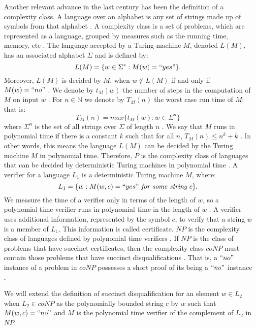 \documentclass[a4paper,UKenglish,cleveref, autoref]{lipics-v2019}
\begin{document}
Another relevant advance in the last century has been the definition of a complexity class. A language over an alphabet is any set of strings made up of symbols from that alphabet \cite{CLRS01}. A complexity class is a set of problems, which are represented as a language, grouped by measures such as the running time, memory, etc \cite{CLRS01}. The language accepted by a Turing machine $M$, denoted $L(M)$, has an associated alphabet $\Sigma$ and is defined by:
\[L(M) = \{w \in \Sigma^{*}: M(w)=``yes" \}.\]
Moreover, $L(M)$ is decided by $M$, when $w \notin L(M)$ if and only if $M(w)=``no"$ \cite{CLRS01}. We denote by $t_{M}(w)$ the number of steps in the computation of $M$ on input $w$ \cite{AB09}. For $n \in \mathbb{N}$ we denote by $T_{M}(n)$ the worst case run time of $M$; that is:
\[T_{M}(n) = max\{t_{M}(w): w \in \Sigma^{n} \}\]
where $\Sigma^{n}$ is the set of all strings over $\Sigma$ of length $n$ \cite{AB09}. We say that $M$ runs in polynomial time if there is a constant $k$ such that for all $n$, $T_{M}(n) \leq n^{k} + k$ \cite{AB09}. In other words, this means the language $L(M)$ can be decided by the Turing machine $M$ in polynomial time. Therefore, $P$ is the complexity class of languages that can be decided by deterministic Turing machines in polynomial time \cite{CLRS01}. A verifier for a language $L_{1}$ is a deterministic Turing machine $M$, where:
\[L_{1} = \{w: M(w, c) = ``yes" \textit{ for some string } c\}.\]
We measure the time of a verifier only in terms of the length of $w$, so a polynomial time verifier runs in polynomial time in the length of $w$ \cite{AB09}. A verifier uses additional information, represented by the symbol $c$, to verify that a string $w$ is a member of $L_{1}$. This information is called certificate. $NP$ is the complexity class of languages defined by polynomial time verifiers \cite{Pap03}. If $NP$ is the class of problems that have succinct certificates, then the complexity class $coNP$ must contain those problems that have succinct disqualifications \cite{Pap03}. That is, a $``no"$ instance of a problem in $coNP$ possesses a short proof of its being a $``no"$ instance \cite{Pap03}.

\begin{definition}
We will extend the definition of succinct disqualification for an element $w \in L_{2}$ when $L_{2} \in coNP$ as the polynomially bounded string $c$ by $w$ such that $M(w, c) = ``no"$ and $M$ is the polynomial time verifier of the complement of $L_{2}$ in $NP$.
\end{definition}
\end{document}
